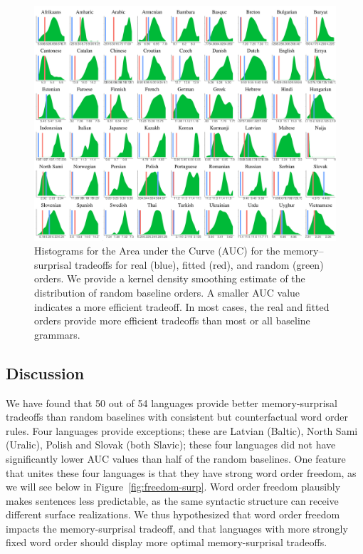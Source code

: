 \begin{figure}
	\begin{center}
\includegraphics[width=\textwidth]{auc-table_MLE.pdf}
\end{center}
\caption{Histograms for the Area under the Curve (AUC) for the memory--surprisal tradeoffs for real (blue), fitted (red), and random (green) orders.
We provide a kernel density smoothing estimate of the distribution of random baseline orders.
A smaller AUC value indicates a more efficient tradeoff.
In most cases, the real and fitted orders provide more efficient tradeoffs than most or all baseline grammars.
}\label{fig:auc}
\end{figure}




\subsection{Discussion}\label{subsec:expt2-discussion}

We have found that 50 out of 54 languages provide better memory-surprisal tradeoffs than random baselines with consistent but counterfactual word order rules.
Four languages provide exceptions; these are Latvian (Baltic), North Sami (Uralic), Polish and Slovak (both Slavic); these four languages did not have significantly lower AUC values than half of the random baselines.
One feature that unites these four languages is that they have strong word order freedom, as we will see below in Figure~\ref{fig:freedom-surp}. %
Word order freedom plausibly makes sentences less predictable, as the same syntactic structure can receive different surface realizations.
We thus hypothesized that word order freedom  impacts the memory-surprisal tradeoff, and that languages with more strongly fixed word order should display more optimal memory-surprisal tradeoffs.


